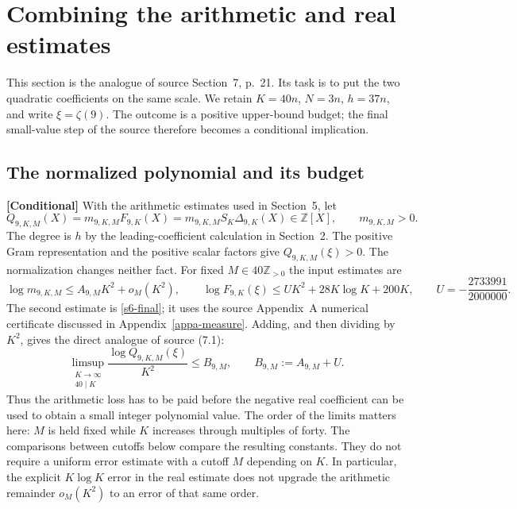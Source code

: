 \section{Combining the arithmetic and real estimates}
\label{s7-completion}

This section is the analogue of source Section~7, p.~21.  Its task is to
put the two quadratic coefficients on the same scale.  We retain
$K=40n$, $N=3n$, $h=37n$, and write $\xi=\zeta(9)$.  The outcome is a
positive upper-bound budget; the final small-value step of the source
therefore becomes a conditional implication.

\subsection{The normalized polynomial and its budget}
\label{s7-budget}

\noindent\textbf{[Conditional]} With the arithmetic estimates used in
Section~5, let
\begin{equation}
 Q_{9,K,M}(X)=m_{9,K,M}F_{9,K}(X)
            =m_{9,K,M}S_K\Delta_{9,K}(X)\in\mathbb Z[X],
 \qquad m_{9,K,M}>0.
 \label{s7-normalized}
\end{equation}
The degree is $h$ by the leading-coefficient calculation in Section~2.
The positive Gram representation and the positive scalar factors give
$Q_{9,K,M}(\xi)>0$.  The normalization changes neither fact.  For fixed
$M\in40\mathbb Z_{>0}$ the input estimates are
\[
 \log m_{9,K,M}\leq A_{9,M}K^2+o_M(K^2),\qquad
 \log F_{9,K}(\xi)\leq UK^2+28K\log K+200K,
 \qquad U=-\frac{2733991}{2000000}.
\]
The second estimate is \eqref{s6-final}; it uses the source Appendix~A
numerical certificate discussed in Appendix~\ref{appa-measure}.
Adding, and then dividing by $K^2$, gives the
direct analogue of source (7.1):
\begin{equation}
 \limsup_{\substack{K\to\infty\\40\mid K}}
  \frac{\log Q_{9,K,M}(\xi)}{K^2}
 \leq B_{9,M},\qquad B_{9,M}:=A_{9,M}+U.
 \label{s7-combined}
\end{equation}
Thus the arithmetic loss has to be paid before the negative real
coefficient can be used to obtain a small integer polynomial value.
The order of the limits matters here: $M$ is held fixed while $K$
increases through multiples of forty.  The comparisons between cutoffs
below compare the resulting constants.  They do not require a uniform
error estimate with a cutoff $M$ depending on $K$.  In particular, the
explicit $K\log K$ error in the real estimate does not upgrade the
arithmetic remainder $o_M(K^2)$ to an error of that same order.

